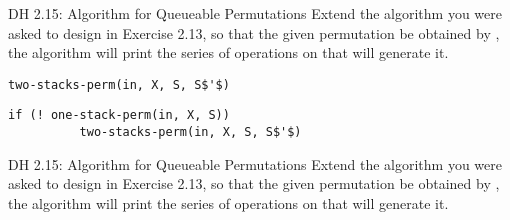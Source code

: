\begin{frame}[fragile]{}
  \begin{exampleblock}{DH 2.15: Algorithm for Queueable Permutations}
    Extend the algorithm you were asked to design in Exercise 2.13,
    so that  the given permutation  be obtained by ,
    the algorithm will print the series of operations on  that will generate it.
  \end{exampleblock}

  \pause

  \pause
  \vspace{-0.20cm}
  \begin{lstlisting}[style = Cstyle]
        two-stacks-perm(in, X, S, S$'$)
  \end{lstlisting}

  \pause
  \begin{lstlisting}[style = Cstyle]
        if (! one-stack-perm(in, X, S))
          two-stacks-perm(in, X, S, S$'$)
  \end{lstlisting}

  \pause
  \centerline{\large {}}
\end{frame}

\begin{frame}{}
  \begin{exampleblock}{DH 2.15: Algorithm for Queueable Permutations}
    Extend the algorithm you were asked to design in Exercise 2.13,
    so that  the given permutation  be obtained by ,
    the algorithm will print the series of operations on  that will generate it.
  \end{exampleblock}


  \pause
  \centerline{} 
  
  \pause
  \centerline{}
\end{frame}

\begin{frame}{}
\end{frame}

